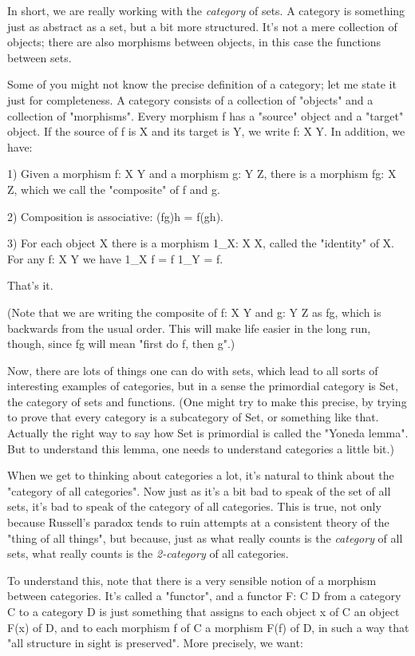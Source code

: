 In short, we are really working with the \emph{category} of sets.  A category
is something just as abstract as a set, but a bit more structured.  
It's not a mere collection of objects; there are also morphisms between
objects, in this case the functions between sets.  

Some of you might not know the precise definition of a category; let me
state it just for completeness.  A category consists of a collection of
"objects" and a collection of "morphisms".  Every morphism f has a
"source" object and a "target" object.  If the source of f is X and its
target is Y, we write f: X \to  Y.  In addition, we have:

1)  Given a morphism f: X \to  Y and a morphism g: Y \to  Z, there
is a morphism fg: X \to  Z, which we call the "composite" of
f and g. 

2)  Composition is associative:  (fg)h = f(gh).

3)  For each object X there is a morphism 1_{X}: X \to  X, called the
"identity" of X.  For any f: X \to  Y we have 1_{X} f = f 1_{Y} =
f.

That's it. 

(Note that we are writing the composite of f: X \to  Y and g: Y \to  Z as
fg, which is backwards from the usual order.  This will make life easier
in the long run, though, since fg will mean "first do f, then g".)

Now, there are lots of things one can do with sets, which lead to all
sorts of interesting examples of categories, but in a sense the
primordial category is Set, the category of sets and functions.  (One
might try to make this precise, by trying to prove that every category
is a subcategory of Set, or something like that.  Actually the right way
to say how Set is primordial is called the "Yoneda lemma".  But to
understand this lemma, one needs to understand categories a little bit.)

When we get to thinking about categories a lot, it's natural to
think about the "category of all categories".  Now just as
it's a bit bad to speak of the set of all sets, it's bad to speak of the
category of all categories.  This is true, not only because Russell's
paradox tends to ruin attempts at a consistent theory of the "thing
of all things", but because, just as what really counts is the
\emph{category} of all sets, what really counts is the \emph{2-category} 
of all categories.

To understand this, note that there is a very sensible notion of a
morphism between categories.  It's called a "functor", and a functor
F: C \to  D from a category C to a category D is just something that
assigns to each object x of C an object F(x) of D, and to each morphism
f of C a morphism F(f) of D, in such a way that "all structure in sight
is preserved".   More precisely, we want:

